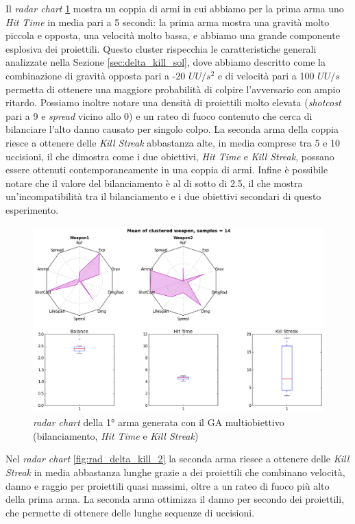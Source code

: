 \documentclass[12pt, italian]{toptesi}
\begin{document}
Il \emph{radar chart} \ref{fig:rad_delta_kill_1} mostra un coppia di armi in cui abbiamo per la prima arma uno \emph{Hit Time} in media pari a 5 secondi: la prima arma mostra una gravità molto piccola e opposta, una velocità molto bassa, e abbiamo una grande componente esplosiva dei proiettili. Questo cluster rispecchia le caratteristiche generali analizzate nella Sezione \ref{sec:delta_kill_sol}, dove abbiamo descritto come la combinazione di gravità opposta pari a -20 $UU/s^2$ e di velocità pari a 100 $UU/s$ permetta di ottenere una maggiore probabilità di colpire l'avversario con ampio ritardo.
Possiamo inoltre notare una densità di proiettili molto elevata (\emph{shotcost} pari a 9 e \emph{spread} vicino allo 0) e un rateo di fuoco contenuto che cerca di bilanciare l'alto danno causato per singolo colpo.
La seconda arma della coppia riesce a ottenere delle \emph{Kill Streak} abbastanza alte, in media comprese tra 5 e 10 uccisioni, il che dimostra come i due obiettivi, \emph{Hit Time} e \emph{Kill Streak}, possano essere ottenuti contemporaneamente in una coppia di armi.
Infine è possibile notare che il valore del bilanciamento è al di sotto di 2.5, il che mostra un'incompatibilità tra il bilanciamento e i due obiettivi secondari di questo esperimento.
\begin{figure}[tp]
\centering
\includegraphics[width=1.0\textwidth]{rad_delta_kill_1}
\caption{\emph{radar chart} della 1°  arma generata con il GA multiobiettivo (bilanciamento, \emph{Hit Time} e \emph{Kill Streak})}
\label{fig:rad_delta_kill_1}
\end{figure}
Nel \emph{radar chart} \ref{fig:rad_delta_kill_2} la seconda arma riesce a ottenere delle \emph{Kill Streak} in media abbastanza lunghe grazie a dei proiettili che combinano velocità, danno e raggio per proiettili quasi massimi, oltre a un rateo di fuoco più alto della prima arma. La seconda arma ottimizza il danno per secondo dei proiettili, che permette di ottenere delle lunghe sequenze di uccisioni.
\end{document}
